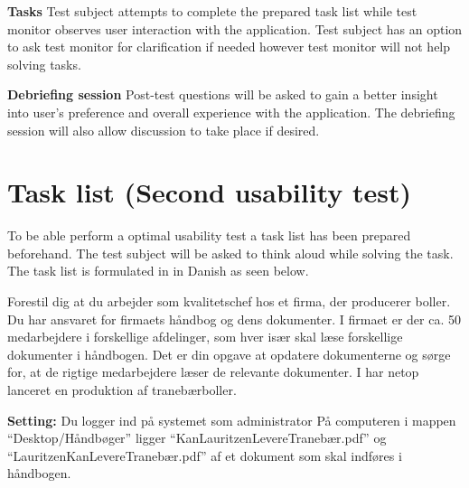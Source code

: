 \textbf{Tasks}
Test subject attempts to complete the prepared task list while test monitor observes user interaction with the application. 
Test subject has an option to ask test monitor for clarification if needed however test monitor will not help solving tasks. 

\textbf{Debriefing session}
Post-test questions will be asked to gain a better insight into user's preference and overall experience with the application. 
The debriefing session will also allow discussion to take place if desired. 

\section{Task list (Second usability test)} \label{sec:utest2tasklist}
To be able perform a optimal usability test a task list has been prepared beforehand. 
The test subject will be asked to think aloud while solving the task.
The task list is formulated in in Danish as seen below.

Forestil dig at du arbejder som kvalitetschef hos et firma, der producerer boller. 
Du har ansvaret for firmaets håndbog og dens dokumenter. 
I firmaet er der ca. 50 medarbejdere i forskellige afdelinger, som hver især skal læse forskellige dokumenter i håndbogen. 
Det er din opgave at opdatere dokumenterne og sørge for, at de rigtige medarbejdere læser de relevante dokumenter. 
I har netop lanceret en produktion af tranebærboller.

\textbf{Setting:}
Du logger ind på systemet som administrator
På computeren i mappen “Desktop/Håndbøger” ligger “KanLauritzenLevereTranebær.pdf”  og “LauritzenKanLevereTranebær.pdf” af et dokument som skal indføres i håndbogen.

